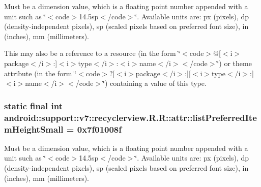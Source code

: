 Must be a dimension value, which is a floating point number appended with a unit such as \char`\"{}$<$code$>$14.5sp$<$/code$>$\char`\"{}. Available units are: px (pixels), dp (density-independent pixels), sp (scaled pixels based on preferred font size), in (inches), mm (millimeters). 

This may also be a reference to a resource (in the form \char`\"{}$<$code$>$@\mbox{[}$<$i$>$package$<$/i$>$:\mbox{]}$<$i$>$type$<$/i$>$:$<$i$>$name$<$/i$>$$<$/code$>$\char`\"{}) or theme attribute (in the form \char`\"{}$<$code$>$?\mbox{[}$<$i$>$package$<$/i$>$:\mbox{]}\mbox{[}$<$i$>$type$<$/i$>$:\mbox{]}$<$i$>$name$<$/i$>$$<$/code$>$\char`\"{}) containing a value of this type. \hypertarget{classandroid_1_1support_1_1v7_1_1recyclerview_1_1_r_1_1attr_74ee75fcf0575a786519802610f68289}{
\subsubsection[{listPreferredItemHeightSmall}]{\setlength{\rightskip}{0pt plus 5cm}static final int android::support::v7::recyclerview.R.R::attr::listPreferredItemHeightSmall = 0x7f01008f}}
\label{classandroid_1_1support_1_1v7_1_1recyclerview_1_1_r_1_1attr_74ee75fcf0575a786519802610f68289}


Must be a dimension value, which is a floating point number appended with a unit such as \char`\"{}$<$code$>$14.5sp$<$/code$>$\char`\"{}. Available units are: px (pixels), dp (density-independent pixels), sp (scaled pixels based on preferred font size), in (inches), mm (millimeters). 

